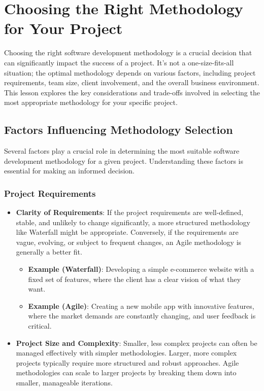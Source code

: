 \section{Choosing the Right Methodology for Your Project}

Choosing the right software development methodology is a crucial decision that
can significantly impact the success of a project. It's not a one-size-fits-all
situation; the optimal methodology depends on various factors, including
project requirements, team size, client involvement, and the overall business
environment. This lesson explores the key considerations and trade-offs
involved in selecting the most appropriate methodology for your specific
project.

\subsection{Factors Influencing Methodology Selection}

Several factors play a crucial role in determining the most suitable software
development methodology for a given project. Understanding these factors is
essential for making an informed decision.

\subsubsection{Project Requirements}

\begin{itemize}
  \item \textbf{Clarity of Requirements}: If the project requirements are well-defined, stable, and unlikely to change significantly, a more structured methodology like Waterfall might be appropriate. Conversely, if the requirements are vague, evolving, or subject to frequent changes, an Agile methodology is generally a better fit.
        \begin{itemize}
          \item \textbf{Example (Waterfall)}: Developing a simple e-commerce website with a fixed set of features, where the client has a clear vision of what they want.
          \item \textbf{Example (Agile)}: Creating a new mobile app with innovative features, where the market demands are constantly changing, and user feedback is critical.
        \end{itemize}
  \item \textbf{Project Size and Complexity}: Smaller, less complex projects can often be managed effectively with simpler methodologies. Larger, more complex projects typically require more structured and robust approaches. Agile methodologies can scale to larger projects by breaking them down into smaller, manageable iterations.
\end{itemize}

